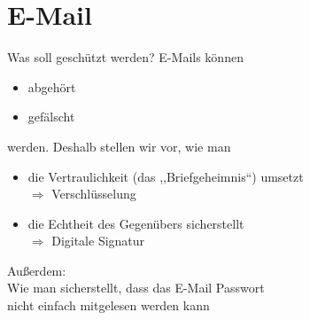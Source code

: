 \section{E-Mail}
\begin{frame}{Was soll geschützt werden?}
  E-Mails können
  \begin{itemize}
    \item abgehört
    \item gefälscht
  \end{itemize}
  werden. \pause Deshalb stellen wir vor, wie man
  \begin{itemize}
    \pause
    \item die Vertraulichkeit (das ,,Briefgeheimnis``) umsetzt
    \\ $\Rightarrow$ Verschlüsselung
    \pause
    \item die Echtheit des Gegenübers sicherstellt
    \\ $\Rightarrow$ Digitale Signatur
  \end{itemize}
  \pause
  \vfill
  Außerdem:\\ Wie man sicherstellt, dass das E-Mail Passwort\\ nicht einfach mitgelesen werden kann
\end{frame}

\renewcommand{\emailtext}{Von: Alice@provider1.de\\An: Bob@provider2.com\\Betreff: Hallo\\Hallo Bob, wie gehts dir?\\LG Alice}
\renewcommand{\emailciphertext}{Von: Alice@provider1.de\\An: Bob@provider2.com\\Betreff: Hallo\\\colorbox{blue}{\parbox[t][1.2em][t]{.88\messagewidth}{~}}}
\settowidth{\messagewidth}{\tiny Hallo Bob, wie gehts dir?}

